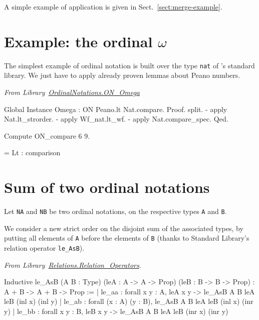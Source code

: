 A simple example of application is given in Sect.~\vref{sect:merge-example}.


\section{Example: the ordinal \texorpdfstring{$\omega$}{omega}}




The simplest example of ordinal notation is built over the type \texttt{nat} of \coq's standard library. We just have to apply already proven lemmas about Peano numbers.

\vspace{4pt}
\noindent\emph{From Library~\href{../theories/html/hydras.OrdinalNotations/ON_Omega.html}{OrdinalNotations.ON\_Omega}}


\begin{Coqsrc}
Global Instance Omega : ON  Peano.lt Nat.compare.
Proof.
 split.
 - apply Nat.lt_strorder.
 - apply Wf_nat.lt_wf.
 - apply Nat.compare_spec.
Qed.

Compute ON_compare 6 9.
\end{Coqsrc}

\begin{Coqanswer}
     = Lt
     : comparison
\end{Coqanswer}

\section{Sum of  two ordinal notations}

Let \texttt{NA} and \texttt{NB} be two ordinal notations, on the respective types \texttt{A} and \texttt{B}.

 We consider a new strict order
on the disjoint sum of the associated types, by putting all elements of \texttt{A} before the elements of \texttt{B} (thanks to Standard Library's relation operator \texttt{le\_AsB}).

\vspace{4pt}
\noindent
\emph{From Library~\href{https://coq.inria.fr/distrib/current/stdlib/Coq.Relations.Relation_Operators.html}{Relations.Relation\_Operators}}.

\begin{Coqanswer}
Inductive
le_AsB (A B : Type) (leA : A -> A -> Prop) (leB : B -> B -> Prop)
  : A + B -> A + B -> Prop :=
| le_aa : forall x y : A, leA x y -> le_AsB A B leA leB (inl x) (inl y)
| le_ab : forall (x : A) (y : B), le_AsB A B leA leB (inl x) (inr y)
| le_bb : forall x y : B, leB x y -> le_AsB A B leA leB (inr x) (inr y)
\end{Coqanswer}


